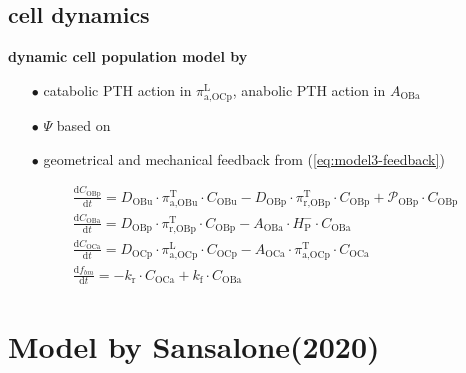 \documentclass[%
aspectratio=169,  %
]{beamer}
\begin{document}
\subsection{cell dynamics}
\begin{frame}
\textbf{dynamic cell population model by \cite{Lavaill.2020}}
\begin{itemize}
	\item[$\bullet$] catabolic PTH action in $\pi_{\text{a,OCp}}^{\text{L}} $, anabolic PTH action in $A_\text{OBa}$
	\item[$\bullet$] $\Psi$ based on \cite{Lerebours.2016}
	\item[$\bullet$]  geometrical and mechanical feedback from (\ref{eq:model3-feedback})
\end{itemize}
\begin{subequations}
	\begin{align}
		& \frac{\text{d} C_\text{OBp}}{\text{d} t} =  D_\text{OBu} \cdot \pi_{\text{a,OBu}}^\text{T} \cdot C_\text{OBu} -  D_\text{OBp}  \cdot \pi_{\text{r,OBp}}^\text{T} \cdot C_\text{OBp} + \mathcal{P}_\text{OBp} \cdot C_\text{OBp}  \\
		& \frac{\text{d} C_\text{OBa}}{\text{d} t} =   D_\text{OBp}  \cdot  \pi_{\text{r,OBp}}^\text{T} \cdot  C_\text{OBp}-  A_\text{OBa} \cdot H^{-}_\text{P} \cdot C_\text{OBa}\\ 
		& \frac{\text{d} C_\text{OCa}}{\text{d} t} =  D_\text{OCp} \cdot \pi_{\text{a,OCp}}^{\text{L}} \cdot C_\text{OCp} -  A_\text{OCa}   \cdot \pi_{\text{a,OCp}}^\text{T} \cdot C_\text{OCa}  \\
		&\frac{\text{d} f_{bm}}{\text{d} t} = -k_\text{r} \cdot C_\text{OCa} + k_\text{f} \cdot C_\text{OBa} 
	\end{align}
\label{eq:model4}
\end{subequations}
\end{frame}

\section*{Model by Sansalone(2020)}
\end{document}
